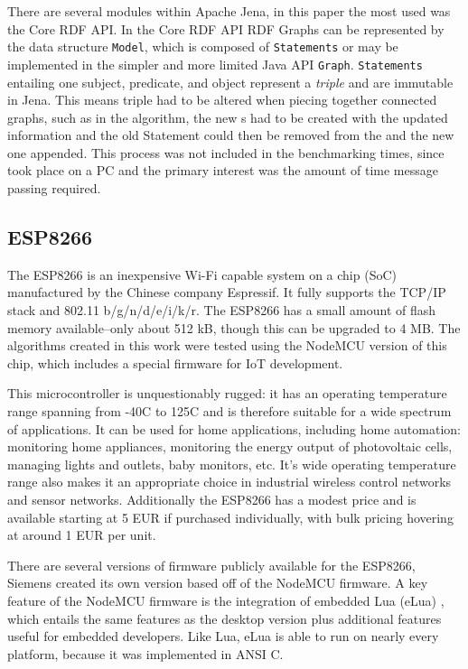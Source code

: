 There are several modules within Apache Jena, in this paper the most  used was the Core RDF API. In the Core RDF API RDF Graphs can be represented by the data structure \texttt{Model}, which is composed of \texttt{Statements} or may be implemented in the simpler and more limited Java API \texttt{Graph}. \texttt{Statements} entailing one subject, predicate, and object represent a \textit{triple} and are immutable in Jena. This means triple had to be altered when piecing together connected graphs, such as in the  algorithm, the new s had to be created with the updated information and the old Statement could then be removed from the  and the new one appended. This process was not included in the benchmarking times, since took place on a PC and the primary interest was the amount of time message passing required. \cite{Jena.24.10.2017}

\subsection{ESP8266}

The ESP8266 is an inexpensive Wi-Fi capable system on a chip (SoC) manufactured by the Chinese company Espressif. It fully supports the TCP/IP stack and 802.11 b/g/n/d/e/i/k/r. The ESP8266 has a small amount of flash memory available--only about 512 kB, though this can be upgraded to 4 MB. The algorithms created in this work were tested using the NodeMCU version of this chip, which includes a special firmware for IoT development. \cite{Zeroday.2017}


This microcontroller is unquestionably rugged: it has an operating temperature range spanning from -40\textdegree{}C to 125\textdegree{}C and is therefore suitable for a wide spectrum of applications. It can be used for home applications, including home automation: monitoring home appliances, monitoring the energy output of photovoltaic cells, managing lights and outlets, baby monitors, etc. It's wide operating temperature range also makes it an appropriate choice in industrial wireless control networks and sensor networks. \cite{espDatasheet} Additionally the ESP8266 has a modest price and is available starting at 5 EUR if purchased individually, with bulk pricing hovering at around 1 EUR per unit. 

There are several versions of firmware publicly available for the ESP8266, Siemens created its own version based off of the NodeMCU firmware. A key feature of the NodeMCU firmware is the integration of embedded Lua (eLua) \cite{Zeroday.2017}, which entails the same features as the desktop version plus additional features useful for embedded developers. Like Lua, eLua is able to run on nearly every platform, because it was implemented in ANSI C. \cite{Marinescu.}

